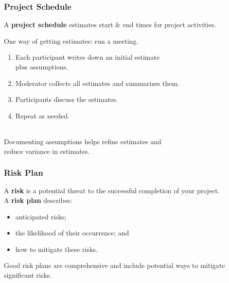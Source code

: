 \begin{frame}

\frametitle{Project Schedule}

\begin{changemargin}{1cm}

A {\bf project schedule} estimates start \& end times for project
activities. 

One way of getting estimates: run a meeting.
\begin{enumerate}
\item Each participant writes down an initial estimate \\ plus assumptions.
\item Moderator collects all estimates and summarizes them.
\item Participants discuss the estimates.
\item Repeat as needed.
\end{enumerate}

~\\

Documenting assumptions helps refine estimates and\\  reduce variance in
estimates. 

\end{changemargin}
\end{frame}

\begin{frame}
\frametitle{Risk Plan}

\begin{changemargin}{1cm}


A {\bf risk} is a potential threat to the successful completion
of your project. \\[1em]

A {\bf risk plan} describes:
\begin{itemize}
\item anticipated risks;
\item the likelihood of their occurrence; and
\item how to mitigate these risks.
\end{itemize}

Good risk plans are comprehensive and include potential ways to
mitigate significant risks.

\end{changemargin}

\end{frame}

